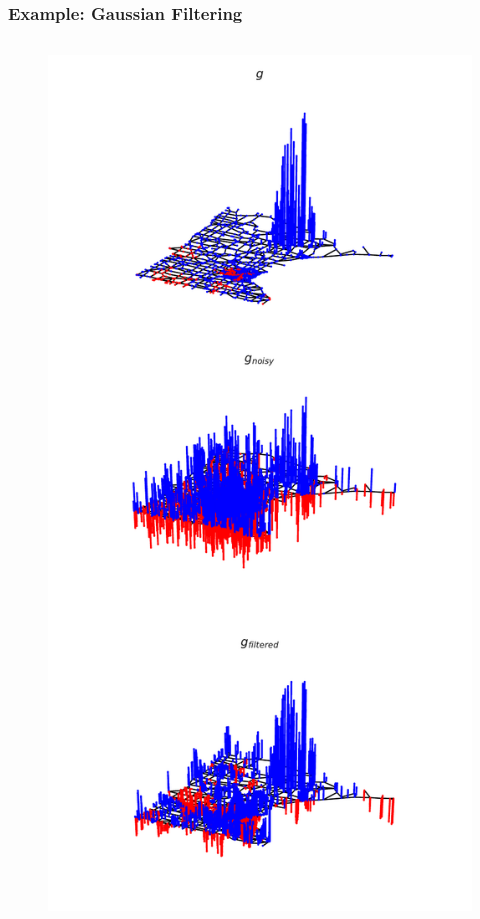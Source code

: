 \documentclass{beamer}
\begin{document}
\begin{frame}
  \frametitle{Example: Gaussian Filtering}
  \begin{columns}
    \begin{column}{0.5\textwidth}
\begin{figure}
\includegraphics[trim={0 10cm 0 0},clip,width=\linewidth]{../img/basic_operations_1.pdf}

\end{figure}
\end{column}
\end{columns}
\end{frame}
\end{document}
